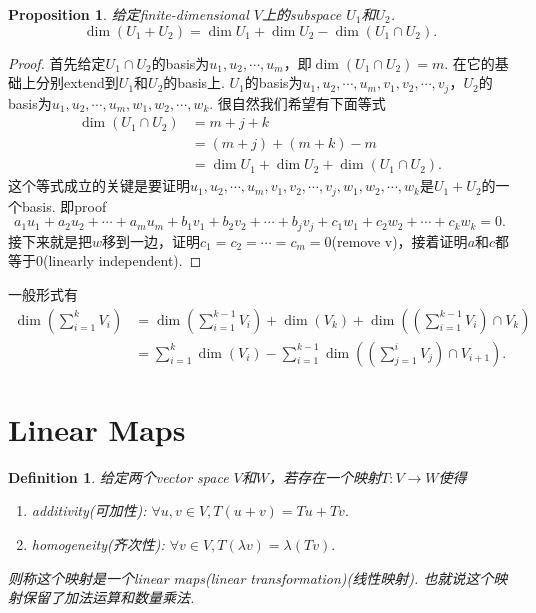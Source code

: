 \documentclass{article}
\newtheorem{proposition}[theorem]{Proposition}
\newtheorem{definition}[theorem]{Definition}
\newcommand*{\xfunc}[4]{{#2}\colon{#3}{#1}{#4}}
\newcommand*{\func}[3]{\xfunc{\to}{#1}{#2}{#3}}
\begin{document}
\begin{proposition}
\rm 给定finite-dimensional $V$上的subspace $U_1$和$U_2$. 
$$
	\dim(U_1+U_2) = \dim U_1 + \dim U_2 - \dim(U_1 \cap U_2).
$$
\end{proposition}

\begin{proof}
首先给定$U_1 \cap U_2$的basis为$u_1,u_2,\cdots,u_m$，即$\dim(U_1 \cap U_2)=m$. 在它的基础上分别extend到$U_1$和$U_2$的basis上. $U_1$的basis为$u_1,u_2,\cdots,u_m,v_1,v_2,\cdots,v_j$，$U_2$的basis为$u_1,u_2,\cdots,u_m,w_1,w_2,\cdots,w_k$. 很自然我们希望有下面等式
$$
\begin{aligned} 
\dim(U_1 \cap U_2) &= m + j + k\\
&= (m+j)+(m+k)-m\\
&= \dim U_1+\dim U_2 + \dim(U_1\cap U_2).
\end{aligned}
$$
这个等式成立的关键是要证明$u_1,u_2,\cdots,u_m,v_1,v_2,\cdots,v_j,w_1,w_2,\cdots,w_k$是$U_1 + U_2$的一个basis. 即proof
$$
a_1u_1+a_2u_2+\cdots+a_mu_m + b_1v_1+b_2v_2+\cdots+b_jv_j+c_1w_1+c_2w_2+\cdots+c_kw_k = 0.
$$
接下来就是把$w$移到一边，证明$c_1=c_2=\cdots=c_m=0$(remove v)，接着证明$a$和$c$都等于$0$(linearly independent).
\end{proof}

{\color{red} 一般形式有}
$$
\begin{aligned}
\dim \left( \sum_{i = 1}^k V_i \right) &= \dim\left( \sum\limits_{i=1}^{k-1} V_i \right) + \dim(V_k) + \dim\left( \left(\sum\limits_{i=1}^{k-1} V_i\right) \cap V_k \right) \\
	&= \sum_{i = 1}^k \dim(V_i) - \sum_{i = 1}^{k-1} \dim \left( \left( \sum_{j = 1}^i V_j \right) \cap V_{i+1} \right).
\end{aligned}	
$$


\newpage
\section{Linear Maps}

\begin{definition}
\rm 给定两个vector space $V$和$W$，若存在一个映射$\func{T}{V}{W}$使得
\begin{enumerate}
	\item additivity(可加性): $\forall u,v \in V,T(u+v)=Tu + Tv.$
	\item homogeneity(齐次性): $\forall v \in V, T(\lambda v) = \lambda (Tv).$
\end{enumerate}
则称这个映射是一个linear maps(linear transformation)(线性映射). 也就说这个映射保留了加法运算和数量乘法. 
\end{definition}
\end{document}
